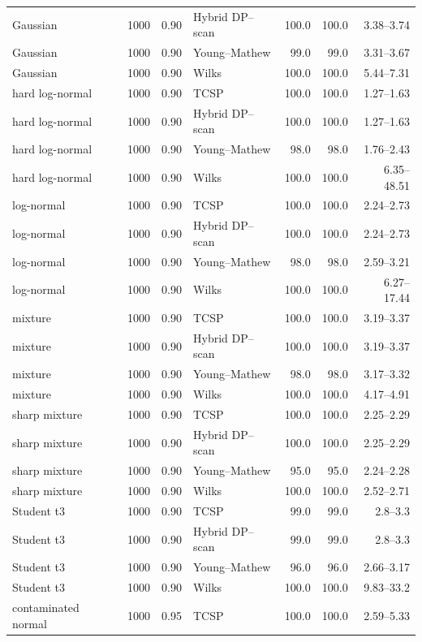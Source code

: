 \begin{longtable}{@{}p{}rrp{}rrr@{}}
Gaussian & 1000 & 0.90 & Hybrid DP--scan & 100.0 & 100.0 & 3.38--3.74 \\
Gaussian & 1000 & 0.90 & Young--Mathew & 99.0 & 99.0 & 3.31--3.67 \\
Gaussian & 1000 & 0.90 & Wilks & 100.0 & 100.0 & 5.44--7.31 \\
hard log-normal & 1000 & 0.90 & TCSP & 100.0 & 100.0 & 1.27--1.63 \\
hard log-normal & 1000 & 0.90 & Hybrid DP--scan & 100.0 & 100.0 & 1.27--1.63 \\
hard log-normal & 1000 & 0.90 & Young--Mathew & 98.0 & 98.0 & 1.76--2.43 \\
hard log-normal & 1000 & 0.90 & Wilks & 100.0 & 100.0 & 6.35--48.51 \\
log-normal & 1000 & 0.90 & TCSP & 100.0 & 100.0 & 2.24--2.73 \\
log-normal & 1000 & 0.90 & Hybrid DP--scan & 100.0 & 100.0 & 2.24--2.73 \\
log-normal & 1000 & 0.90 & Young--Mathew & 98.0 & 98.0 & 2.59--3.21 \\
log-normal & 1000 & 0.90 & Wilks & 100.0 & 100.0 & 6.27--17.44 \\
mixture & 1000 & 0.90 & TCSP & 100.0 & 100.0 & 3.19--3.37 \\
mixture & 1000 & 0.90 & Hybrid DP--scan & 100.0 & 100.0 & 3.19--3.37 \\
mixture & 1000 & 0.90 & Young--Mathew & 98.0 & 98.0 & 3.17--3.32 \\
mixture & 1000 & 0.90 & Wilks & 100.0 & 100.0 & 4.17--4.91 \\
sharp mixture & 1000 & 0.90 & TCSP & 100.0 & 100.0 & 2.25--2.29 \\
sharp mixture & 1000 & 0.90 & Hybrid DP--scan & 100.0 & 100.0 & 2.25--2.29 \\
sharp mixture & 1000 & 0.90 & Young--Mathew & 95.0 & 95.0 & 2.24--2.28 \\
sharp mixture & 1000 & 0.90 & Wilks & 100.0 & 100.0 & 2.52--2.71 \\
Student t3 & 1000 & 0.90 & TCSP & 99.0 & 99.0 & 2.8--3.3 \\
Student t3 & 1000 & 0.90 & Hybrid DP--scan & 99.0 & 99.0 & 2.8--3.3 \\
Student t3 & 1000 & 0.90 & Young--Mathew & 96.0 & 96.0 & 2.66--3.17 \\
Student t3 & 1000 & 0.90 & Wilks & 100.0 & 100.0 & 9.83--33.2 \\
contaminated normal & 1000 & 0.95 & TCSP & 100.0 & 100.0 & 2.59--5.33 \\

\end{longtable}
